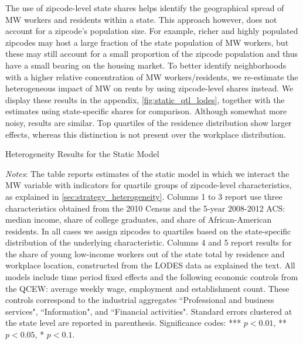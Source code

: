 The use of zipcode-level state shares helps identify the geographical spread of MW 
workers and residents within a state. This approach however, does not account for 
a zipcode's population size. For example, richer and highly populated zipcodes may host a large 
fraction of the state population of MW workers, but these may still account for a small proportion 
of the zipcode population and thus have a small bearing on the housing market. To better identify 
neighborhoods with a higher relative concentration of MW workers/residents, we re-estimate the 
heterogeneous impact of MW on rents by using zipcode-level shares instead. We display these results 
in the appendix, \autoref{fig:static_qtl_lodes}, together with the estimates using state-specific 
shares for comparison. Although somewhat more noisy, results are similar. Top 
quartiles of the residence distribution show larger effects, whereas this distinction is not 
present over the workplace distribution.

\begin{table}[h!]
    \caption{Heterogeneity Results for the Static Model}
    \label{tab:fd_model_het}
    \centering
    \resizebox{\textwidth}{!}{
    }
    \begin{minipage}{0.95\textwidth} \footnotesize
		\vspace{3mm}
		\textit{Notes}: The table reports estimates of the static model in which we interact the 
		MW variable with indicators for quartile groups of zipcode-level characteristics, as explained
		in \autoref{sec:strategy_heterogeneity}. Columns 1 to 3 report use three characteristics 
		obtained from the 2010 Census and the 5-year 2008-2012 ACS: median income, share of college
		graduates, and share of African-American residents. In all cases we assign zipcodes to quartiles 
		based on the state-specific distribution of the underlying characteristic. Columns 4 and 5 
		report results for the share of young low-income workers out of the state total by residence
		and workplace location, constructed from the LODES data as explained the text. All models
		include time period fixed effects and the following economic controls from the QCEW: average
		weekly wage, employment and establishment count. These controls correspond to the industrial 
		aggregates ``Professional and business services", ``Information", and ``Financial activities".
		Standard errors clustered at the state level are reported in parenthesis. Significance codes: 
		*** $p < 0.01$, ** $p < 0.05$, * $p < 0.1$.
	\end{minipage}
\end{table}
